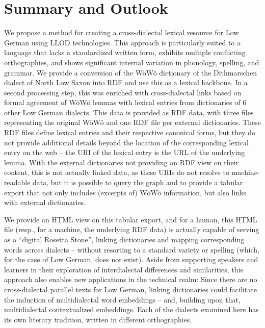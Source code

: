 \section{Summary and Outlook}

We propose a method for creating a cross-dialectal lexical resource for Low German using LLOD technologies. This approach is particularly suited to a language that lacks a standardized written form, exhibits multiple conflicting orthographies, and shows significant internal variation in phonology, spelling, and grammar. 
We provide a conversion of the WöWö dictionary of the Dithmarschen dialect of North Low Saxon into RDF and use this as a lexical backbone. In a second processing step, this was enriched with cross-dialectal links based on formal agreement of WöWö lemmas with lexical entries from dictionaries of 6 other Low German dialects.
This data is provided as RDF data, with three files representing the original WöWö and one RDF file per external dictionaries. These RDF files define lexical entries and their respective canonical forms, but they do not provide additional details beyond the location of the corresponding lexical entry on the web -- the URI of the lexical entry is the URL of the underlying lemma. With the external dictionaries not providing an RDF view on their content, this is not actually linked data, as these URIs do not resolve to machine-readable data, but it is possible to query the graph and to provide a tabular export that not only includes (excerpts of) WöWö information, but also links with external dictionaries.

We provide an HTML view on this tabular export, and for a human, this HTML file (resp., for a machine, the underlying RDF data) is actually capable of serving as a ``digital Rosetta Stone'', linking dictionaries and mapping corresponding words across dialects -- without resorting to a standard variety or spelling (which, for the case of Low German, does not exist). 
Aside from supporting speakers and learners in their exploration of interdialectal differences and similarities, this approach also enables new applications in the technical realm: Since there are no cross-dialectal parallel texts for Low German, linking dictionaries could facilitate the induction of multidialectal word embeddings -- and, building upon that, multidialectal contextualized embeddings. Each of the dialects examined here has its own literary tradition, written in different orthographies.

